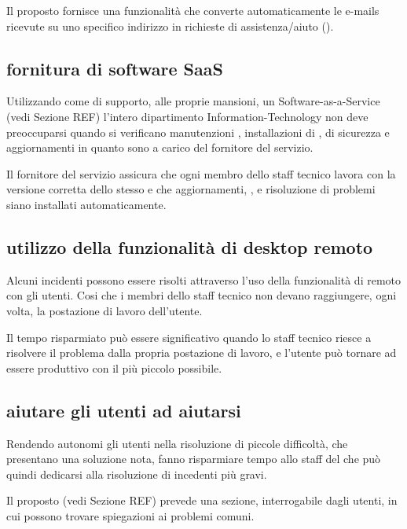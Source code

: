 Il  proposto fornisce una funzionalità che converte automaticamente le e-mails ricevute su uno specifico indirizzo in richieste di assistenza/aiuto ().

\subsection[Fornitura di software SaaS]{fornitura di software SaaS}
\label{sd-users-experience-saas}
Utilizzando come  di supporto, alle proprie mansioni, un \ac{Software-as-a-Service} (vedi Sezione REF) l'intero dipartimento \acs{Information-Technology} non deve preoccuparsi quando si verificano manutenzioni , installazioni di ,  di sicurezza e aggiornamenti  in quanto sono a carico del fornitore del servizio.

Il fornitore del servizio  assicura che ogni membro dello staff tecnico lavora con la versione corretta dello stesso e che aggiornamenti, , e risoluzione di problemi siano installati automaticamente.

\subsection[Utilizzo della funzionalità di desktop remoto]{utilizzo della funzionalità di desktop remoto}
\label{sd-users-experience-remote-desktop}
Alcuni incidenti possono essere risolti attraverso l'uso della funzionalità di  remoto con gli utenti. Cosi che i membri dello staff tecnico non devano raggiungere, ogni volta, la postazione di lavoro dell'utente.

Il tempo risparmiato può essere significativo quando lo staff tecnico riesce a risolvere il problema dalla propria postazione di lavoro, e l'utente può tornare ad essere produttivo con il più piccolo  possibile.

\subsection[Aiutare gli utenti ad aiutarsi]{aiutare gli utenti ad aiutarsi}
\label{sd-user-experience-help}
Rendendo autonomi gli utenti nella risoluzione di piccole difficoltà, che presentano una soluzione nota, fanno risparmiare tempo allo staff del  che può quindi dedicarsi alla risoluzione di incedenti più gravi.

Il  proposto (vedi Sezione REF) prevede una sezione, interrogabile dagli utenti, in cui possono trovare spiegazioni ai problemi comuni.